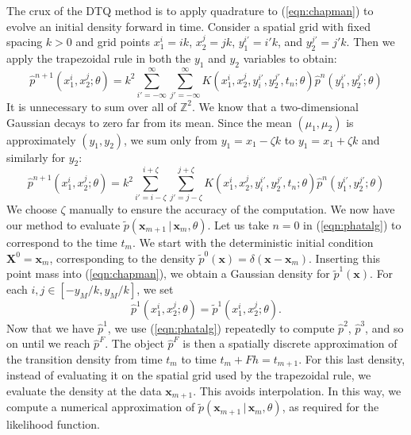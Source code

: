 \documentclass[graybox]{svmult}
\begin{document}
The crux of the DTQ method is to apply quadrature to (\ref{eqn:chapman}) to evolve an initial density forward in time.  Consider a spatial grid with fixed spacing $k > 0$ and grid points $x_1^i = ik$, $x_2^j = jk$, $y_1^{i'} = i'k$, and $y_2^{j'} = j'k$.  Then we apply the trapezoidal rule in both the $y_1$ and $y_2$ variables to obtain:
\begin{equation}
\hat{p}^{n+1}(x_1^i, x_2^j ;\theta) = k^2 \sum\limits_{i' = -\infty}^{\infty} \sum\limits_{j' = -\infty}^{\infty} K(x_1^i, x_2^j, y_i^{i'}, y_2^{j'},t_n; \theta)  \hat{p}^n(y_1^{i'}, y_2^{j'}; \theta)
\end{equation}
It is unnecessary to sum over all of $\mathbb{Z}^2$.  We know that a two-dimensional Gaussian decays to zero far from its mean.  Since the mean $(\mu_1,\mu_2)$ is approximately $(y_1,y_2)$, we sum only from $y_1 = x_1 - \zeta k$ to $y_1 = x_1 + \zeta k$ and similarly for $y_2$:
\begin{equation}
\label{eqn:phatalg}
\hat{p}^{n+1}(x_1^i, x_2^j;\theta ) = k^2 \sum\limits_{i' = i - \zeta}^{i+ \zeta} \sum\limits_{j' = j-\zeta}^{j+\zeta} K(x_1^i, x_2^j, y_i^{i'}, y_2^{j'},t_n; \theta) \hat{p}^n(y_1^{i'}, y_2^{j'}; \theta)
\end{equation}
We choose $\zeta$ manually to ensure the accuracy of the computation.
We now have our method to evaluate $\widetilde{p}(\mathbf{x}_{m+1} \, | \, \mathbf{x}_m, \theta)$.  Let us take $n=0$ in (\ref{eqn:phatalg}) to correspond to the time $t_m$.  We start with the deterministic initial condition $\mathbf{X}^0 = \mathbf{x}_m$, corresponding to the density $\widetilde{p}^0(\mathbf{x}) = \delta(\mathbf{x} - \mathbf{x}_m)$.  Inserting this point mass into (\ref{eqn:chapman}), we obtain a Gaussian density for $\widetilde{p}^1(\mathbf{x})$.  For each $i,j \in [-y_M/k, y_M/k]$, we set
$$
\hat{p}^1(x_1^i, x_2^j; \theta) = \widetilde{p}^1(x_1^i, x_2^j; \theta).
$$
Now that we have $\hat{p}^1$, we use (\ref{eqn:phatalg}) repeatedly to
compute $\hat{p}^2$, $\hat{p}^3$, and so on until we reach
$\hat{p}^F$.  The object $\hat{p}^F$ is then a spatially discrete
approximation of the transition density from time $t_m$ to time $t_m +
Fh = t_{m+1}$.  For this last density, instead of evaluating it on the
spatial grid used by the trapezoidal rule, we evaluate the density at
the data $\mathbf{x}_{m+1}$.  This avoids interpolation.  In this way,
we compute a numerical approximation of $\widetilde{p}(\mathbf{x}_{m+1} \, | \, \mathbf{x}_m, \theta)$, as required for the likelihood function.
\end{document}
